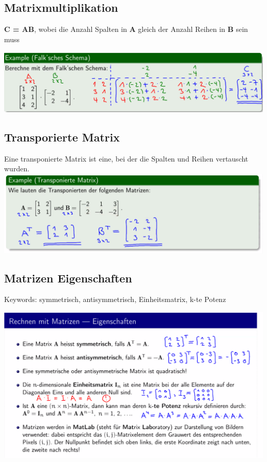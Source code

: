 \documentclass[12pt]{scrartcl}
\begin{document}
\subsection{Matrixmultiplikation}
\textbf{C = AB}, wobei die Anzahl Spalten in \textbf{A} gleich der Anzahl Reihen in \textbf{B}
sein muss

\includegraphics[width=15cm]{img/matrizenmultiplikation.png}

\subsection{Transporierte Matrix}
Eine transponierte Matrix ist eine, bei der die Spalten und Reihen vertauscht wurden.\\

\includegraphics[width=15cm]{img/transponierte_matrix.png}

\subsection{Matrizen Eigenschaften}
Keywords: symmetrisch, antisymmetrisch, Einheitsmatrix, k-te Potenz

\includegraphics[width=16cm]{img/matrizen_eigenschaften.png}
\end{document}
